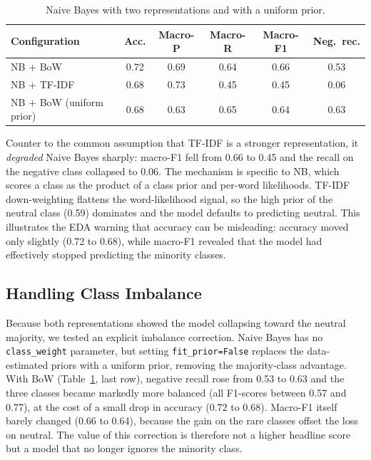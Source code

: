 \documentclass[sigconf,nonacm]{acmart}
\begin{document}
\begin{table}[t]
\centering
\caption{Naive Bayes with two representations and with a uniform prior.}
\label{tab:nb-rep}
\begin{tabular}{lccccc}
\toprule
Configuration & Acc. & Macro-P & Macro-R & Macro-F1 & Neg.\ rec. \\
\midrule
NB + BoW                 & 0.72 & 0.69 & 0.64 & 0.66 & 0.53 \\
NB + TF-IDF              & 0.68 & 0.73 & 0.45 & 0.45 & 0.06 \\
NB + BoW (uniform prior) & 0.68 & 0.63 & 0.65 & 0.64 & 0.63 \\
\bottomrule
\end{tabular}
\end{table}

Counter to the common assumption that TF-IDF is a stronger representation, it \emph{degraded} Naive Bayes sharply: macro-F1 fell from 0.66 to 0.45 and the recall on the negative class collapsed to 0.06. The mechanism is specific to NB, which scores a class as the product of a class prior and per-word likelihoods. TF-IDF down-weighting flattens the word-likelihood signal, so the high prior of the neutral class (0.59) dominates and the model defaults to predicting neutral. This illustrates the EDA warning that accuracy can be misleading: accuracy moved only slightly (0.72 to 0.68), while macro-F1 revealed that the model had effectively stopped predicting the minority classes.

\subsection{Handling Class Imbalance}

Because both representations showed the model collapsing toward the neutral majority, we tested an explicit imbalance correction. Naive Bayes has no \texttt{class\_weight} parameter, but setting \texttt{fit\_prior=False} replaces the data-estimated priors with a uniform prior, removing the majority-class advantage. With BoW (Table~\ref{tab:nb-rep}, last row), negative recall rose from 0.53 to 0.63 and the three classes became markedly more balanced (all F1-scores between 0.57 and 0.77), at the cost of a small drop in accuracy (0.72 to 0.68). Macro-F1 itself barely changed (0.66 to 0.64), because the gain on the rare classes offset the loss on neutral. The value of this correction is therefore not a higher headline score but a model that no longer ignores the minority class.
\end{document}
